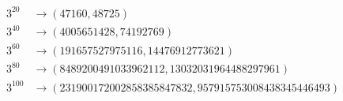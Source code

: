 \documentclass[11pt]{article}
\begin{document}
\begin{equation*}
\begin{split}
3^{20}  &\rightarrow (47160, 48725) \\
3^{40}  &\rightarrow (4005651428, 74192769) \\
3^{60}  &\rightarrow (191657527975116, 14476912773621) \\
3^{80}  &\rightarrow (8489200491033962112, 13032031964488297961) \\
3^{100}  &\rightarrow (231900172002858385847832, 957915753008438345446493) \\
\end{split}
\end{equation*}
\end{document}
